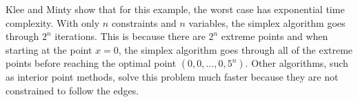 %
%
%
%

Klee and Minty show that for this example, the worst case has exponential time complexity.
With only $n$ constraints and $n$ variables, the simplex algorithm goes through $2^n$ iterations.
This is because there are $2^n$ extreme points and when starting at the point $x=0$, the simplex algorithm goes through all of the extreme points before reaching the optimal point $(0,0,\dots, 0, 5^n)$.
Other algorithms, such as interior point methods, solve this problem much faster because they are not constrained to follow the edges.


% 
